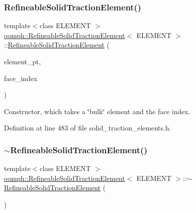 \subsubsection{\texorpdfstring{Refineable\+Solid\+Traction\+Element()}{RefineableSolidTractionElement()}}
{\footnotesize\ttfamily template$<$class E\+L\+E\+M\+E\+NT $>$ \\
\hyperlink{classoomph_1_1RefineableSolidTractionElement}{oomph\+::\+Refineable\+Solid\+Traction\+Element}$<$ E\+L\+E\+M\+E\+NT $>$\+::\hyperlink{classoomph_1_1RefineableSolidTractionElement}{Refineable\+Solid\+Traction\+Element} (\begin{DoxyParamCaption}\item[{\hyperlink{classoomph_1_1FiniteElement}{Finite\+Element} $\ast$const \&}]{element\+\_\+pt,  }\item[{const int \&}]{face\+\_\+index }\end{DoxyParamCaption})\hspace{0.3cm}{\ttfamily [inline]}}



Constructor, which takes a \char`\"{}bulk\char`\"{} element and the face index. 



Definition at line 483 of file solid\+\_\+traction\+\_\+elements.\+h.

\mbox{\label{classoomph_1_1RefineableSolidTractionElement_a29953035bc2d3e0f0c5ca276c57a9fba}} 
\subsubsection{\texorpdfstring{$\sim$\+Refineable\+Solid\+Traction\+Element()}{~RefineableSolidTractionElement()}}
{\footnotesize\ttfamily template$<$class E\+L\+E\+M\+E\+NT $>$ \\
\hyperlink{classoomph_1_1RefineableSolidTractionElement}{oomph\+::\+Refineable\+Solid\+Traction\+Element}$<$ E\+L\+E\+M\+E\+NT $>$\+::$\sim$\hyperlink{classoomph_1_1RefineableSolidTractionElement}{Refineable\+Solid\+Traction\+Element} (\begin{DoxyParamCaption}{ }\end{DoxyParamCaption})\hspace{0.3cm}{\ttfamily [inline]}}



